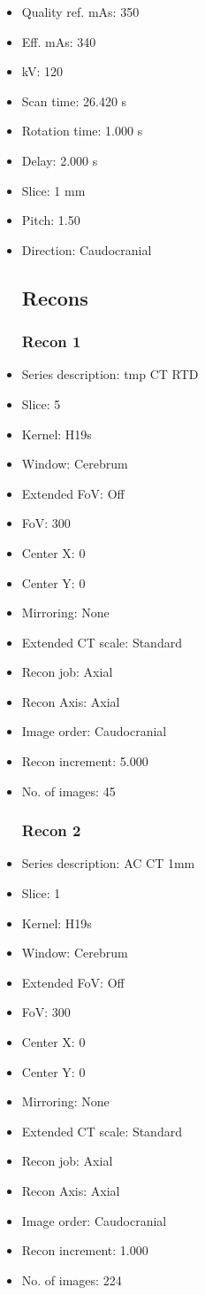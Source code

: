 \documentclass[12pt]{article}
\begin{document}
\begin{itemize}
\subsection{Scan}
\item Quality ref. mAs: 350\item Eff. mAs: 340\item kV: 120\item Scan time: 26.420 s\item Rotation time: 1.000 s\item Delay: 2.000 s\item Slice: 1 mm\item Pitch: 1.50\item Direction: Caudocranial\subsection{Recons}

\subsubsection{Recon 1}
\item Series description: tmp CT RTD
\item Slice: 5
\item Kernel: H19s
\item Window: Cerebrum
\item Extended FoV: Off
\item FoV: 300
\item Center X: 0
\item Center Y: 0
\item Mirroring: None
\item Extended CT scale: Standard
\item Recon job: Axial
\item Recon Axis: Axial
\item Image order: Caudocranial
\item Recon increment: 5.000
\item No. of images: 45
\subsubsection{Recon 2}
\item Series description: AC CT 1mm
\item Slice: 1
\item Kernel: H19s
\item Window: Cerebrum
\item Extended FoV: Off
\item FoV: 300
\item Center X: 0
\item Center Y: 0
\item Mirroring: None
\item Extended CT scale: Standard
\item Recon job: Axial
\item Recon Axis: Axial
\item Image order: Caudocranial
\item Recon increment: 1.000
\item No. of images: 224

\end{itemize}
\end{document}
